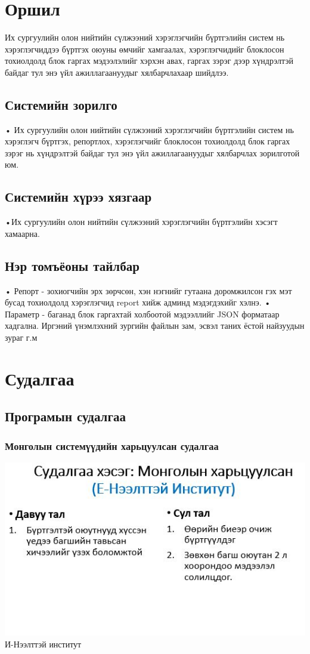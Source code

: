 \documentclass[
oneside, %
english, %
onehalfspacing, %
nolistspacing, %
headsepline, %
]{article} %
\begin{document}
    \tableofcontents %
   
	\section{Оршил}
	   
	   Их сургуулийн олон нийтийн сүлжээний хэрэглэгчийн бүртгэлийн систем нь хэрэглэгчиддээ бүртгэх оюуны өмчийг хамгаалах, хэрэглэгчидийг блоклосон тохиолдолд блок гаргах мэдээлэлийг хэрхэн авах, гаргах зэрэг дээр хүндрэлтэй байдаг тул энэ үйл ажиллагаануудыг хялбарчлахаар шийдлээ.
	   
	\subsection{Системийн зорилго}
	• Их сургуулийн олон нийтийн сүлжээний хэрэглэгчийн бүртгэлийн систем нь хэрэглэгч бүртгэх, репортлох, хэрэглэгчийг блоклосон тохиолдолд блок гаргах зэрэг нь хүндрэлтэй байдаг тул энэ үйл ажиллагаануудыг хялбарчлах зорилготой юм.
	\subsection{Системийн хүрээ хязгаар}
	•Их сургуулийн олон нийтийн сүлжээний хэрэглэгчийн бүртгэлийн хэсэгт хамаарна.
	\subsection{Нэр томъёоны тайлбар}
	• Репорт - зохиогчийн эрх зөрчсөн, хэн нэгнийг гутаана доромжилсон гэх мэт бусад тохиолдолд хэрэглэгчид report хийж админд мэдэгдэхийг хэлнэ.
	• Параметр - баганад блок гаргахтай холбоотой мэдээллийг 
	JSON форматаар хадгална. Иргэний үнэмлэхний зургийн 
	файлын зам, эсвэл таних ёстой найзуудын зураг г.м
	\section{Судалгаа}
	\subsection{Програмын судалгаа}
	\subsubsection{Монголын системүүдийн харьцуулсан судалгаа}
	 \includegraphics[width=\textwidth]{mongolsudalgaa}
   {И-Нээлттэй институт}
   
\end{document}
